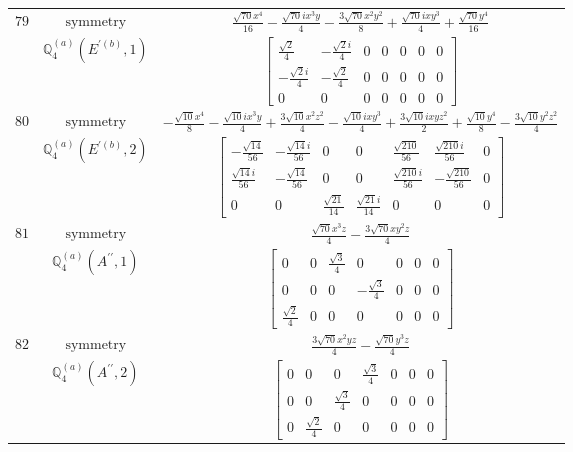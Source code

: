 \documentclass[fleqn,8pt,landscape]{jsarticle}
\begin{document}
\begin{longtable}{ccc}
$ 79 $ & $ \text{symmetry} $ & $ \frac{\sqrt{70} x^{4}}{16} - \frac{\sqrt{70} i x^{3} y}{4} - \frac{3 \sqrt{70} x^{2} y^{2}}{8} + \frac{\sqrt{70} i x y^{3}}{4} + \frac{\sqrt{70} y^{4}}{16} $ \\
$  $ & $ \mathbb{Q}_{4}^{(a)}(E^{\prime(b)},1) $ & $ \begin{bmatrix} \frac{\sqrt{2}}{4} & - \frac{\sqrt{2} i}{4} & 0 & 0 & 0 & 0 & 0 \\ - \frac{\sqrt{2} i}{4} & - \frac{\sqrt{2}}{4} & 0 & 0 & 0 & 0 & 0 \\ 0 & 0 & 0 & 0 & 0 & 0 & 0 \end{bmatrix} $ \\ \hline
$ 80 $ & $ \text{symmetry} $ & $ - \frac{\sqrt{10} x^{4}}{8} - \frac{\sqrt{10} i x^{3} y}{4} + \frac{3 \sqrt{10} x^{2} z^{2}}{4} - \frac{\sqrt{10} i x y^{3}}{4} + \frac{3 \sqrt{10} i x y z^{2}}{2} + \frac{\sqrt{10} y^{4}}{8} - \frac{3 \sqrt{10} y^{2} z^{2}}{4} $ \\
$  $ & $ \mathbb{Q}_{4}^{(a)}(E^{\prime(b)},2) $ & $ \begin{bmatrix} - \frac{\sqrt{14}}{56} & - \frac{\sqrt{14} i}{56} & 0 & 0 & \frac{\sqrt{210}}{56} & \frac{\sqrt{210} i}{56} & 0 \\ \frac{\sqrt{14} i}{56} & - \frac{\sqrt{14}}{56} & 0 & 0 & \frac{\sqrt{210} i}{56} & - \frac{\sqrt{210}}{56} & 0 \\ 0 & 0 & \frac{\sqrt{21}}{14} & \frac{\sqrt{21} i}{14} & 0 & 0 & 0 \end{bmatrix} $ \\ \hline
$ 81 $ & $ \text{symmetry} $ & $ \frac{\sqrt{70} x^{3} z}{4} - \frac{3 \sqrt{70} x y^{2} z}{4} $ \\
$  $ & $ \mathbb{Q}_{4}^{(a)}(A^{\prime\prime},1) $ & $ \begin{bmatrix} 0 & 0 & \frac{\sqrt{3}}{4} & 0 & 0 & 0 & 0 \\ 0 & 0 & 0 & - \frac{\sqrt{3}}{4} & 0 & 0 & 0 \\ \frac{\sqrt{2}}{4} & 0 & 0 & 0 & 0 & 0 & 0 \end{bmatrix} $ \\ \hline
$ 82 $ & $ \text{symmetry} $ & $ \frac{3 \sqrt{70} x^{2} y z}{4} - \frac{\sqrt{70} y^{3} z}{4} $ \\
$  $ & $ \mathbb{Q}_{4}^{(a)}(A^{\prime\prime},2) $ & $ \begin{bmatrix} 0 & 0 & 0 & \frac{\sqrt{3}}{4} & 0 & 0 & 0 \\ 0 & 0 & \frac{\sqrt{3}}{4} & 0 & 0 & 0 & 0 \\ 0 & \frac{\sqrt{2}}{4} & 0 & 0 & 0 & 0 & 0 \end{bmatrix} $ \\ \hline

\end{longtable}
\end{document}
